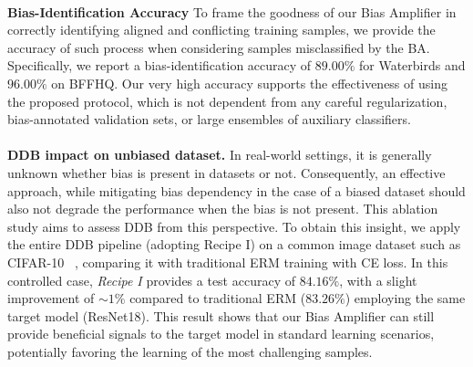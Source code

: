 \\ \noindent \textbf{Bias-Identification Accuracy}
To frame the goodness of our Bias Amplifier in correctly identifying aligned and conflicting training samples, we provide the accuracy of such process when considering samples misclassified by the BA. Specifically, we report a bias-identification accuracy of $89.00\%$ for Waterbirds and $96.00\%$ on BFFHQ. Our very high accuracy supports the effectiveness of using the proposed protocol, which is not dependent from any careful regularization, bias-annotated validation sets, or large ensembles of auxiliary classifiers. 
\\
\\
\noindent \textbf{DDB impact on unbiased dataset.}
In real-world settings, it is generally unknown whether bias is present in datasets or not. Consequently, an effective approach, while mitigating bias dependency in the case of a biased dataset should also not degrade the performance when the bias is not present. This ablation study aims to assess DDB from this perspective. To obtain this insight, we apply the entire DDB pipeline (adopting Recipe I) on a common image dataset such as CIFAR-10 ~\cite{krizhevsky2009learning}, comparing it with traditional ERM training with CE loss. In this controlled case, \textit{Recipe I} provides a test accuracy of $84.16\%$, with a slight improvement of $\sim 1\%$ compared to traditional ERM ($83.26 \%$) employing the same target model (ResNet18). This result shows that our Bias Amplifier can still provide beneficial signals to the target model in standard learning scenarios, potentially favoring the learning of the most challenging samples.  

